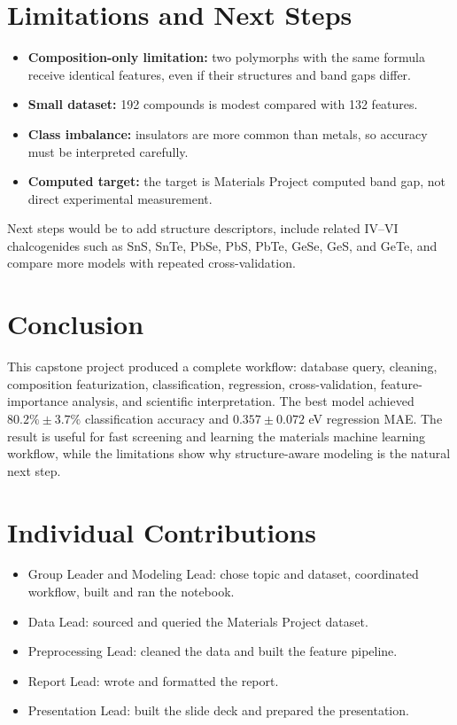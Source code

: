 \documentclass[11pt,a4paper]{article}
\begin{document}
\section{Limitations and Next Steps}

\begin{itemize}
  \item \textbf{Composition-only limitation:} two polymorphs with the same formula receive identical features, even if their structures and band gaps differ.
  \item \textbf{Small dataset:} 192 compounds is modest compared with 132 features.
  \item \textbf{Class imbalance:} insulators are more common than metals, so accuracy must be interpreted carefully.
  \item \textbf{Computed target:} the target is Materials Project computed band gap, not direct experimental measurement.
\end{itemize}

Next steps would be to add structure descriptors, include related IV--VI chalcogenides such as SnS, SnTe, PbSe, PbS, PbTe, GeSe, GeS, and GeTe, and compare more models with repeated cross-validation.

\section{Conclusion}

This capstone project produced a complete workflow: database query, cleaning, composition featurization, classification, regression, cross-validation, feature-importance analysis, and scientific interpretation. The best model achieved \(80.2\% \pm 3.7\%\) classification accuracy and \(0.357 \pm 0.072\) eV regression MAE. The result is useful for fast screening and learning the materials machine learning workflow, while the limitations show why structure-aware modeling is the natural next step.

\section{Individual Contributions}

\begin{itemize}
  \item Group Leader and Modeling Lead: chose topic and dataset, coordinated workflow, built and ran the notebook.
  \item Data Lead: sourced and queried the Materials Project dataset.
  \item Preprocessing Lead: cleaned the data and built the feature pipeline.
  \item Report Lead: wrote and formatted the report.
  \item Presentation Lead: built the slide deck and prepared the presentation.
\end{itemize}
\end{document}
